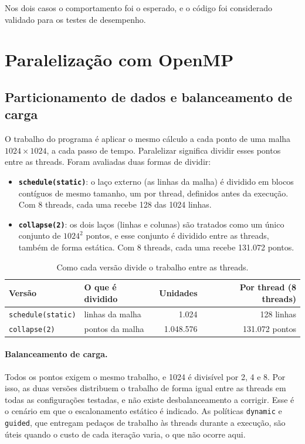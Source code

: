 \documentclass[a4paper,12pt]{article}
\begin{document}
Nos dois casos o comportamento foi o esperado, e o código foi considerado
validado para os testes de desempenho.

\section{Paralelização com OpenMP}

\subsection{Particionamento de dados e balanceamento de carga}

O trabalho do programa é aplicar o mesmo cálculo a cada ponto de uma malha
$1024 \times 1024$, a cada passo de tempo. Paralelizar significa dividir esses
pontos entre as threads. Foram avaliadas duas formas de dividir:

\begin{itemize}
    \item \textbf{\texttt{schedule(static)}}: o laço externo (as linhas da malha)
    é dividido em blocos contíguos de mesmo tamanho, um por thread, definidos
    antes da execução. Com 8 threads, cada uma recebe 128 das 1024 linhas.
    \item \textbf{\texttt{collapse(2)}}: os dois laços (linhas e colunas) são
    tratados como um único conjunto de $1024^2$ pontos, e esse conjunto é dividido
    entre as threads, também de forma estática. Com 8 threads, cada uma recebe
    131.072 pontos.
\end{itemize}

\begin{table}[ht]
\centering
\caption{Como cada versão divide o trabalho entre as threads.}
\label{tab:particao}
\small
\begin{tabular}{l p{4.6cm} r r}
\toprule
Versão & O que é dividido & Unidades & Por thread (8 threads) \\
\midrule
\texttt{schedule(static)} & linhas da malha & 1.024 & 128 linhas \\
\texttt{collapse(2)} & pontos da malha & 1.048.576 & 131.072 pontos \\
\bottomrule
\end{tabular}
\end{table}

\paragraph{Balanceamento de carga.} Todos os pontos exigem o mesmo trabalho, e
1024 é divisível por 2, 4 e 8. Por isso, as duas versões distribuem o trabalho
de forma igual entre as threads em todas as configurações testadas, e não
existe desbalanceamento a corrigir. Esse é o cenário em que o escalonamento
estático é indicado. As políticas \texttt{dynamic} e \texttt{guided}, que
entregam pedaços de trabalho às threads durante a execução, são úteis quando o
custo de cada iteração varia, o que não ocorre aqui.
\end{document}
